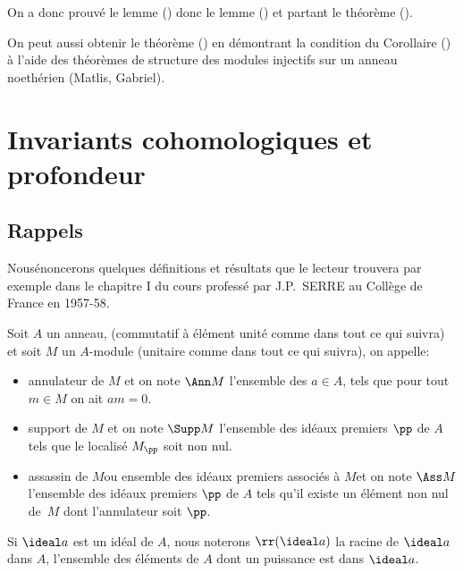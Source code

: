 On a donc prouv\'e le lemme () donc le lemme () et partant le th\'eor\`eme ().

\begin{remarquestar}
On peut aussi obtenir le th\'eor\`eme () en d\'emontrant la condition du Corollaire () \`a l'aide des th\'eor\`emes de structure des modules injectifs sur un anneau noeth\'erien (Matlis, Gabriel).
\end{remarquestar}

\chapter{Invariants cohomologiques et profondeur} \label{III}

\section{Rappels} \label{III.1}

Nous\pageoriginale \'enoncerons quelques d\'efinitions et r\'esultats que le lecteur trouvera par exemple dans le chapitre I du cours profess\'e par J.P.~SERRE au Coll\`ege de France en 1957-58.

\begin{definition} \label{def:III.1.1}
Soit $A$ un anneau, (commutatif \`a \'el\'ement unit\'e comme dans tout ce qui suivra) et soit $M$ un $A$-module (unitaire comme dans tout ce qui suivra), on appelle:
\begin{itemize}
\item
annulateur de $M$ et on note $\Ann M$ l'ensemble des $a\in A$, tels que pour tout $m\in M$ on ait $am=0$.

\item
support de $M$ et on note $\Supp M$ l'ensemble des id\'eaux premiers $\pp $ de $A$ tels que le localis\'e $M_\pp$ soit non nul.

\item
\og assassin de $M$\fg ou \og ensemble des id\'eaux premiers associ\'es \`a $M$\fg et on note $\Ass M$ l'ensemble des id\'eaux premiers $\pp $ de $A$ tels qu'il existe un \'el\'ement non nul de~$M$ dont l'annulateur soit $\pp $.
\end{itemize}

Si $\ideal a$ est un id\'eal de $A$, nous noterons $\rr(\ideal a)$ la racine de $\ideal a$ dans $A$, \ie l'ensemble des \'el\'ements de $A$ dont un puissance est dans $\ideal a$.
\end{definition}

